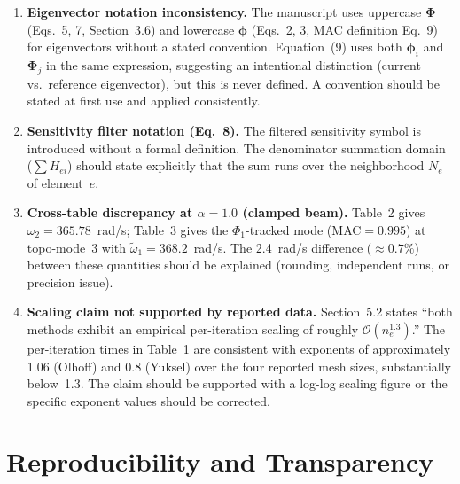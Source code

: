 \documentclass[11pt,a4paper]{article}
\begin{document}
\begin{enumerate}[leftmargin=*, label=\textbf{M\arabic*.}]

\item \textbf{Eigenvector notation inconsistency.}
The manuscript uses uppercase $\boldsymbol{\Phi}$ (Eqs.~5, 7,
Section~3.6) and lowercase $\boldsymbol{\phi}$ (Eqs.~2, 3, MAC
definition Eq.~9) for eigenvectors without a stated convention.
Equation~(9) uses both $\boldsymbol{\phi}_i$ and $\boldsymbol{\Phi}_j$
in the same expression, suggesting an intentional distinction (current
vs.\ reference eigenvector), but this is never defined. A convention
should be stated at first use and applied consistently.

\item \textbf{Sensitivity filter notation (Eq.~8).}
The filtered sensitivity symbol is introduced without a formal
definition. The denominator summation domain ($\sum H_{ei}$) should
state explicitly that the sum runs over the neighborhood $N_e$ of
element~$e$.

\item \textbf{Cross-table discrepancy at $\alpha=1.0$ (clamped beam).}
Table~2 gives $\omega_2=365.78$~rad/s; Table~3 gives the
$\Phi_1$-tracked mode (MAC$=0.995$) at topo-mode~3 with
$\widetilde{\omega}_1=368.2$~rad/s. The 2.4~rad/s difference
($\approx0.7\%$) between these quantities should be explained
(rounding, independent runs, or precision issue).

\item \textbf{Scaling claim not supported by reported data.}
Section~5.2 states ``both methods exhibit an empirical per-iteration
scaling of roughly $\mathcal{O}(n_e^{1.3})$.'' The per-iteration times
in Table~1 are consistent with exponents of approximately 1.06 (Olhoff)
and 0.8 (Yuksel) over the four reported mesh sizes, substantially
below~1.3. The claim should be supported with a log-log scaling figure
or the specific exponent values should be corrected.

\end{enumerate}

\section{Reproducibility and Transparency}
\end{document}
